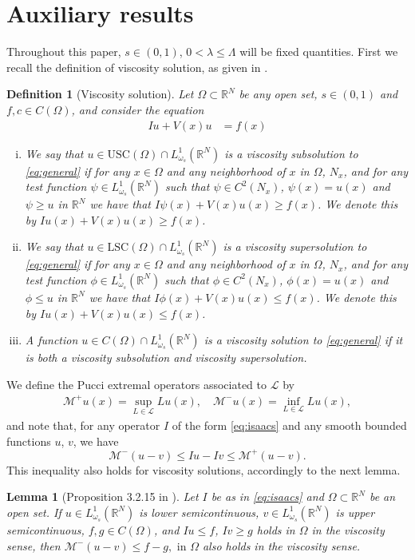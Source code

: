 \documentclass[a4paper,11pt]{article}
\newcommand{\R}{\mathbb{R}}
\newcommand{\M}{\mathcal{M}}
\newcommand{\lsc}{\text{LSC}}
\newcommand{\Lomega}{L_{\omega_s}^1(\R^N)}
\newtheorem{lemma}[theorem]{Lemma}
\newtheorem{definition}{Definition}
\begin{document}
\section{Auxiliary results}
\label{sect:def}

Throughout this paper, $s\in (0,1)$, $0<\lambda \leq \Lambda$ will be fixed quantities. First we recall the definition of viscosity solution, as given in \cite{fernandez-real_integro-differential_2024}. 

\begin{definition}[Viscosity solution]
\label{def:viscosity}
Let $\Omega \subset \R^N$ be any open set, $s\in (0,1)$ and $f,c\in C(\Omega)$, and consider the equation
\begin{align}
\label{eq:general}
Iu + V(x)u &= f(x)
\end{align}
\begin{enumerate}[i.]
\item We say that $u \in \text{USC}(\Omega) \cap \Lomega$ is a \textit{viscosity subsolution} to \eqref{eq:general} if for any $x\in \Omega$ and any neighborhood of $x$ in $\Omega$, $N_x$, and for any test function $\psi \in \Lomega$ such that $\psi \in C^2(N_x)$, $\psi(x) = u(x)$ and $\psi \geq u$ in $\R^N$ we have that $I\psi(x) + V(x)u(x) \geq f(x)$. We denote this by $Iu(x) + V(x)u(x) \geq f(x)$.
\item We say that $u \in \lsc(\Omega) \cap \Lomega$ is a \textit{viscosity supersolution} to \eqref{eq:general} if for any $x\in \Omega$ and any neighborhood of $x$ in $\Omega$, $N_x$, and for any test function $\phi \in \Lomega$ such that $\phi \in C^2(N_x)$, $\phi(x) = u(x)$ and $\phi \leq u$ in $\R^N$ we have that $I\phi(x) + V(x)u(x) \leq f(x)$. We denote this by $Iu(x) + V(x)u(x) \leq f(x)$.
\item A function $u \in C(\Omega) \cap \Lomega$ is a \textit{viscosity solution} to \eqref{eq:general} if it is both a viscosity subsolution and viscosity supersolution.
\end{enumerate}
\end{definition}

We define the Pucci extremal operators associated to $\mathcal{L}$ by
\begin{align*}
\M^+u(x) = \sup_{L\in \mathcal{L}} Lu(x), \quad 
\M^-u(x) = \inf_{L\in \mathcal{L}} Lu(x),
\end{align*}
and note that, for any operator $I$ of the form \eqref{eq:isaacs} and any smooth bounded functions $u$, $v$, we have
\begin{equation*}
\label{eq:ellipticity}
\M^-(u-v) \leq Iu - Iv \leq \M^+(u-v).
\end{equation*}
This inequality also holds for viscosity solutions, accordingly to the next lemma.
\begin{lemma}[Proposition 3.2.15 in \cite{fernandez-real_integro-differential_2024}]
\label{lemma:eqdifference}
Let $I$ be as in \eqref{eq:isaacs} and $\Omega\subset\R^N$ be an open set. If $u\in\Lomega$ is lower semicontinuous, $v\in\Lomega$ is upper semicontinuous, $f,g \in C(\Omega)$, and $Iu \leq f$, $Iv \geq g$ holds in $\Omega$ in the viscosity sense, then $\M^-(u-v) \leq f-g,\text{ in } \Omega$ also holds in the viscosity sense.
\end{lemma}
\end{document}
